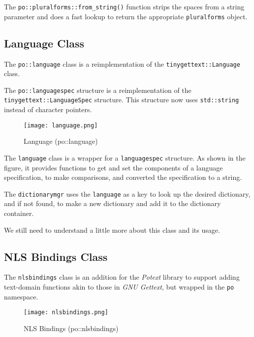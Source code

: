   The \texttt{po::pluralforms::from\_string()} function strips the
   spaces from a string parameter and does a fast lookup to return the
   appropriate \texttt{pluralforms} object.

\subsection{Language Class}
\label{subsec:potext_language_class}

   The \texttt{po::language} class is a reimplementation of the
   \texttt{tinygettext::Language} class.

   The \texttt{po::languagespec} structure is a reimplementation of the
   \texttt{tinygettext::LanguageSpec} structure.
   This structure now uses \texttt{std::string} instead of character pointers.

\begin{figure}[H]
   \centering 
   \texttt{[image: language.png]}
   \caption{Language (po::language)}
   \label{fig:potext_language}
\end{figure}

   The \texttt{language} class is a wrapper for a
   \texttt{languagespec} structure.
   As shown in the figure, it provides functions to get and set the
   components of a language specification, to make comparisons, and
   converted the specification to a string.

   The \texttt{dictionarymgr} uses the
   \texttt{language} as a key to look up the desired dictionary, and
   if not found, to make a new dictionary and add it to the dictionary
   container.

   We still need to understand a little more about this class and its usage.

\subsection{NLS Bindings Class}
\label{subsec:potext_nlsbindings_class}

   The \texttt{nlsbindings} class is an addition for the \textsl{Potext}
   library to support adding text-domain functions akin to those in
   \textsl{GNU Gettext}, but wrapped in the \texttt{po} namespace.

\begin{figure}[H]
   \centering 
   \texttt{[image: nlsbindings.png]}
   \caption{NLS Bindings (po::nlsbindings)}
   \label{fig:nlsbindings}
\end{figure}

